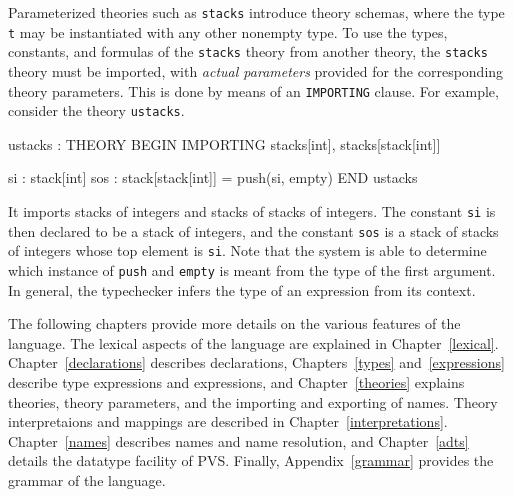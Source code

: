 Parameterized theories such as \texttt{stacks} introduce theory schemas,
where the type \texttt{t} may be instantiated with any other nonempty
type.  To use the types, constants, and formulas of the \texttt{stacks}
theory from another theory, the \texttt{stacks} theory must be imported,
with \emph{actual parameters} provided for the corresponding theory
parameters.  This is done by means of an \texttt{IMPORTING} clause. For
example, consider the theory \texttt{ustacks}.
\begin{session}
  ustacks : THEORY
   BEGIN
    IMPORTING stacks[int], stacks[stack[int]]

    si : stack[int]
    sos : stack[stack[int]] = push(si, empty)
   END ustacks
\end{session}
It imports stacks of integers and stacks of stacks of integers.  The constant
\texttt{si} is then declared to be a stack of integers, and the constant
\texttt{sos} is a stack of stacks of integers whose top element is
\texttt{si}.  Note that the system is able to determine which instance of
\texttt{push} and \texttt{empty} is meant from the type of the first
argument.  In general, the typechecker infers the type of an expression
from its context.  

The following chapters provide more details on the various features of the
language.  The lexical aspects of the language are explained in
Chapter~\ref{lexical}.  Chapter~\ref{declarations} describes declarations,
Chapters~\ref{types} and~\ref{expressions} describe type expressions and
expressions, and Chapter~\ref{theories} explains theories, theory
parameters, and the importing and exporting of names.  Theory
interpretaions and mappings are described in
Chapter~\ref{interpretations}.  Chapter~\ref{names} describes names and
name resolution, and Chapter~\ref{adts} details the datatype facility of
PVS.  Finally, Appendix~\ref{grammar} provides the grammar of the
language.

